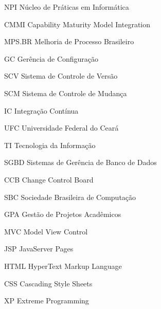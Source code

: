 \begin{siglas}
  \item[NPI] Núcleo de Práticas em Informática
  \item[CMMI] Capability Maturity Model Integration
  \item[MPS.BR] Melhoria de Processo Brasileiro
  \item[GC] Gerência de Configuração
  \item[SCV] Sistema de Controle de Versão
  \item[SCM] Sistema de Controle de Mudança
  \item[IC]  Integração Contínua
  \item[UFC] Universidade Federal do Ceará
  \item[TI] Tecnologia da Informação
  \item[SGBD] Sistemas de Gerência de Banco de Dados
  \item[CCB] Change Control Board
  \item[SBC] Sociedade Brasileira de Computação
  \item[GPA] Gestão de Projetos Acadêmicos
  \item[MVC] Model View Control
  \item[JSP] JavaServer Pages
  \item[HTML] HyperText Markup Language
  \item[CSS] Cascading Style Sheets
  \item[XP] Extreme Programming
\end{siglas}
